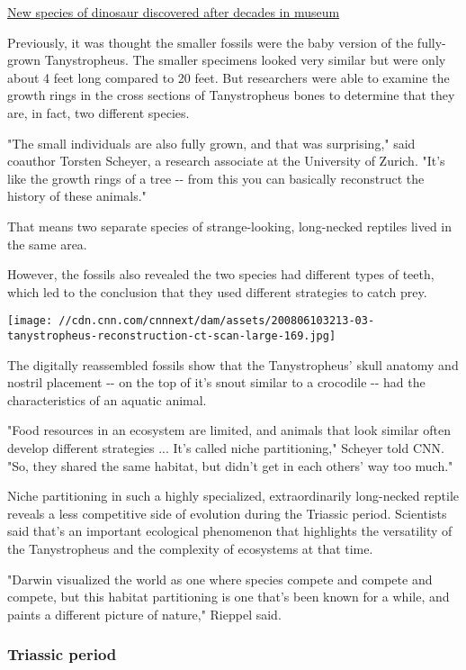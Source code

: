 \href{/travel/article/new-dinosaur-intl-scli-gbr-scn/index.html}{New
species of dinosaur discovered after decades in museum}

Previously, it was thought the smaller fossils were the baby version of
the fully-grown Tanystropheus. The smaller specimens looked very similar
but were only about 4 feet long compared to 20 feet. But researchers
were able to examine the growth rings in the cross sections of
Tanystropheus bones to determine that they are, in fact, two different
species.

"The small individuals are also fully grown, and that was surprising,"
said coauthor Torsten Scheyer, a research associate at the University of
Zurich. "It's like the growth rings of a tree -\/- from this you can
basically reconstruct the history of these animals."

That means two separate species of strange-looking, long-necked reptiles
lived in the same area.

However, the fossils also revealed the two species had different types
of teeth, which led to the conclusion that they used different
strategies to catch prey.

\texttt{[image: //cdn.cnn.com/cnnnext/dam/assets/200806103213-03-tanystropheus-reconstruction-ct-scan-large-169.jpg]}

The digitally reassembled fossils show that the Tanystropheus' skull
anatomy and nostril placement -\/- on the top of it's snout similar to a
crocodile -\/- had the characteristics of an aquatic animal.

"Food resources in an ecosystem are limited, and animals that look
similar often develop different strategies ... It's called niche
partitioning," Scheyer told CNN. "So, they shared the same habitat, but
didn't get in each others' way too much."

Niche partitioning in such a highly specialized, extraordinarily
long-necked reptile reveals a less competitive side of evolution during
the Triassic period. Scientists said that's an important ecological
phenomenon that highlights the versatility of the Tanystropheus and the
complexity of ecosystems at that time.

"Darwin visualized the world as one where species compete and compete
and compete, but this habitat partitioning is one that's been known for
a while, and paints a different picture of nature," Rieppel said.

\hypertarget{triassic-period}{%
\subsubsection{Triassic period}\label{triassic-period}}

